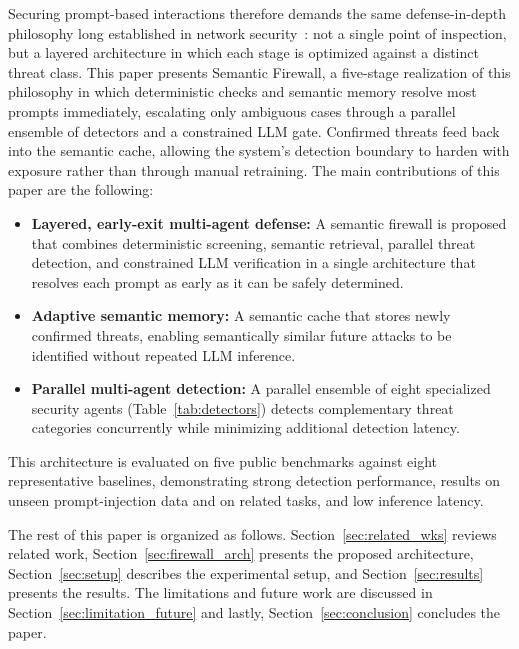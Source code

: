 \documentclass[runningheads]{llncs}
\newif\ifrev
\newcommand{\rev}[1]{\ifrev\hl{#1}\else#1\fi}                  %
\begin{document}
Securing prompt-based interactions therefore demands the same defense-in-depth philosophy long established in network security~\cite{saltzer1975protection}: not a single point of inspection, but a layered architecture in which each stage is optimized against a distinct threat class. This paper presents Semantic Firewall, a five-stage realization of this philosophy in which deterministic checks and semantic memory resolve most prompts immediately, escalating only ambiguous cases through a parallel ensemble of detectors and a constrained LLM gate. Confirmed threats feed back into the semantic cache, allowing the system's detection boundary to harden with exposure rather than through manual retraining. The main contributions of this paper are the following: \begin{itemize}
\item[1.] \textbf{Layered, early-exit multi-agent defense:}
A semantic firewall is proposed that combines deterministic screening, semantic retrieval, parallel threat detection, and constrained LLM verification in a single architecture that resolves each prompt as early as it can be safely determined.
\item[2.] \textbf{Adaptive semantic memory:}
A semantic cache \rev{that} stores newly confirmed threats, enabling semantically similar future attacks to be identified without repeated LLM inference.
\item[3.] \textbf{Parallel multi-agent detection:}
A parallel ensemble of eight specialized security agents (Table~\ref{tab:detectors}) detects complementary threat categories concurrently while minimizing additional detection latency.
\end{itemize}
This architecture is evaluated on five public benchmarks against \rev{eight} representative baselines, demonstrating strong detection performance, \rev{results on unseen prompt-injection data and on related tasks}, and low inference latency.

The rest of this paper is organized as follows. Section~\ref{sec:related_wks}
reviews related work, Section~\ref{sec:firewall_arch} presents the
proposed architecture, Section~\ref{sec:setup} describes the
experimental setup, and Section~\ref{sec:results} presents the results. The limitations and future work are discussed in Section~\ref{sec:limitation_future} and lastly,
Section~\ref{sec:conclusion} concludes the paper.
\end{document}
